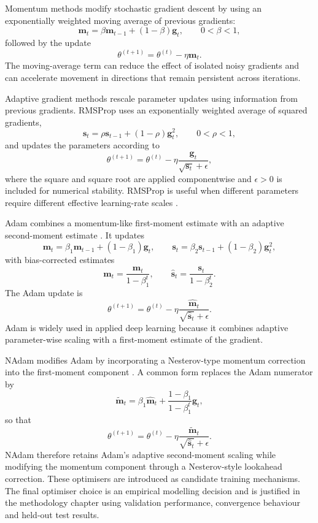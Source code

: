 \noindent
Momentum methods modify stochastic gradient descent by using an exponentially
weighted moving average of previous gradients:
\[
    \mathbf{m}_{t}
    =
    \beta\mathbf{m}_{t-1}
    +
    (1-\beta)\mathbf{g}_{t},
    \qquad
    0<\beta<1,
\]
followed by the update
\[
    \theta^{(t+1)}
    =
    \theta^{(t)}
    -
    \eta\mathbf{m}_{t}.
\]
The moving-average term can reduce the effect of isolated noisy gradients and
can accelerate movement in directions that remain persistent across iterations.

\noindent
Adaptive gradient methods rescale parameter updates using information from
previous gradients. RMSProp uses an exponentially weighted average of squared
gradients,
\[
    \mathbf{s}_{t}
    =
    \rho\mathbf{s}_{t-1}
    +
    (1-\rho)\mathbf{g}_{t}^{2},
    \qquad
    0<\rho<1,
\]
and updates the parameters according to
\[
    \theta^{(t+1)}
    =
    \theta^{(t)}
    -
    \eta
    \frac{\mathbf{g}_{t}}
         {\sqrt{\mathbf{s}_{t}}+\epsilon},
\]
where the square and square root are applied componentwise and
\(\epsilon>0\) is included for numerical stability. RMSProp is useful when
different parameters require different effective learning-rate scales
\citep{ruder2016overview}.

\noindent
Adam combines a momentum-like first-moment estimate with an adaptive
second-moment estimate \citep{kingma2015adam}. It updates
\[
    \mathbf{m}_{t}
    =
    \beta_{1}\mathbf{m}_{t-1}
    +
    (1-\beta_{1})\mathbf{g}_{t},
    \qquad
    \mathbf{s}_{t}
    =
    \beta_{2}\mathbf{s}_{t-1}
    +
    (1-\beta_{2})\mathbf{g}_{t}^{2},
\]
with bias-corrected estimates
\[
    \widehat{\mathbf{m}}_{t}
    =
    \frac{\mathbf{m}_{t}}{1-\beta_{1}^{t}},
    \qquad
    \widehat{\mathbf{s}}_{t}
    =
    \frac{\mathbf{s}_{t}}{1-\beta_{2}^{t}}.
\]
The Adam update is
\[
    \theta^{(t+1)}
    =
    \theta^{(t)}
    -
    \eta
    \frac{\widehat{\mathbf{m}}_{t}}
         {\sqrt{\widehat{\mathbf{s}}_{t}}+\epsilon}.
\]
Adam is widely used in applied deep learning because it combines adaptive
parameter-wise scaling with a first-moment estimate of the gradient.

\noindent
NAdam modifies Adam by incorporating a
Nesterov-type momentum correction into the first-moment component
\citep{dozat2016incorporating}. A common form replaces the Adam numerator by
\[
    \widetilde{\mathbf{m}}_{t}
    =
    \beta_{1}\widehat{\mathbf{m}}_{t}
    +
    \frac{1-\beta_{1}}{1-\beta_{1}^{t}}
    \mathbf{g}_{t},
\]
so that
\[
    \theta^{(t+1)}
    =
    \theta^{(t)}
    -
    \eta
    \frac{\widetilde{\mathbf{m}}_{t}}
         {\sqrt{\widehat{\mathbf{s}}_{t}}+\epsilon}.
\]
NAdam therefore retains Adam's adaptive second-moment scaling while modifying
the momentum component through a Nesterov-style lookahead correction. These
optimisers are introduced as candidate training mechanisms. The final optimiser
choice is an empirical modelling decision and is justified in the methodology
chapter using validation performance, convergence behaviour and held-out test
results.

